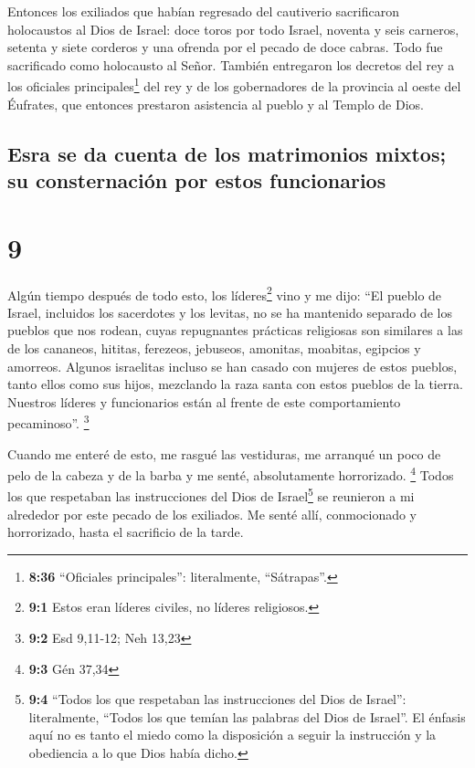  Entonces los exiliados que habían regresado del
cautiverio sacrificaron holocaustos al Dios de Israel: doce toros por
todo Israel, noventa y seis carneros, setenta y siete corderos y una
ofrenda por el pecado de doce cabras. Todo fue sacrificado como
holocausto al Señor.  También entregaron los decretos del
rey a los oficiales principales\footnote{\textbf{8:36} ``Oficiales
  principales'': literalmente, ``Sátrapas''.} del rey y de los
gobernadores de la provincia al oeste del Éufrates, que entonces
prestaron asistencia al pueblo y al Templo de Dios.

\hypertarget{esra-se-da-cuenta-de-los-matrimonios-mixtos-su-consternaciuxf3n-por-estos-funcionarios}{%
\subsection{Esra se da cuenta de los matrimonios mixtos; su
consternación por estos
funcionarios}\label{esra-se-da-cuenta-de-los-matrimonios-mixtos-su-consternaciuxf3n-por-estos-funcionarios}}

\hypertarget{section-8}{%
\section{9}\label{section-8}}

 Algún tiempo después de todo esto, los líderes\footnote{\textbf{9:1}
  Estos eran líderes civiles, no líderes religiosos.} vino y me dijo:
``El pueblo de Israel, incluidos los sacerdotes y los levitas, no se ha
mantenido separado de los pueblos que nos rodean, cuyas repugnantes
prácticas religiosas son similares a las de los cananeos, hititas,
ferezeos, jebuseos, amonitas, moabitas, egipcios y amorreos.
 Algunos israelitas incluso se han casado con mujeres de
estos pueblos, tanto ellos como sus hijos, mezclando la raza santa con
estos pueblos de la tierra. Nuestros líderes y funcionarios están al
frente de este comportamiento pecaminoso''. \footnote{\textbf{9:2} Esd
  9,11-12; Neh 13,23}

 Cuando me enteré de esto, me rasgué las vestiduras, me
arranqué un poco de pelo de la cabeza y de la barba y me senté,
absolutamente horrorizado. \footnote{\textbf{9:3} Gén 37,34}
 Todos los que respetaban las instrucciones del Dios de
Israel\footnote{\textbf{9:4} ``Todos los que respetaban las
  instrucciones del Dios de Israel'': literalmente, ``Todos los que
  temían las palabras del Dios de Israel''. El énfasis aquí no es tanto
  el miedo como la disposición a seguir la instrucción y la obediencia a
  lo que Dios había dicho.} se reunieron a mi alrededor por este pecado
de los exiliados. Me senté allí, conmocionado y horrorizado, hasta el
sacrificio de la tarde.

